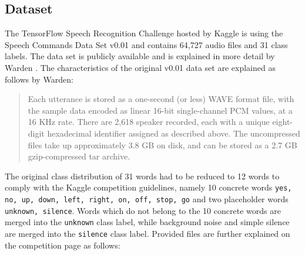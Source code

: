 \documentclass{article}
\theoremstyle{definition}
\theoremstyle{remark}
\begin{document}
\subsection{Dataset} 

The TensorFlow Speech Recognition Challenge hosted by Kaggle \cite{kaggle_challenge} is using the Speech Commands Data Set v0.01 and contains 64,727 audio files and 31 class labels. The data set is publicly available \cite{scd_v1} and is explained in more detail by Warden \cite{warden2018speech}. The characteristics of the original v0.01 data set are explained as follows by Warden:

\begin{quote}
Each utterance is stored as a one-second (or less) WAVE format file, with the sample data encoded as linear 16-bit single-channel PCM values, at a 16 KHz rate. There are 2,618 speaker recorded, each with a unique eight-digit hexadecimal identifier assigned as described above. The uncompressed files take up approximately 3.8 GB on disk, and can be stored as a 2.7 GB gzip-compressed tar archive.
\end{quote}

The original class distribution of 31 words had to be reduced to 12 words to comply with the Kaggle competition guidelines, namely 10 concrete words \texttt{yes, no, up, down, left, right, on, off, stop, go} and two placeholder words \texttt{unknown, silence}. Words which do not belong to the 10 concrete words are merged into the \texttt{unknown} class label, while background noise and simple silence are merged into the \texttt{silence} class label. Provided files are further explained on the competition page \cite{kaggle_challenge} as follows:
\end{document}

